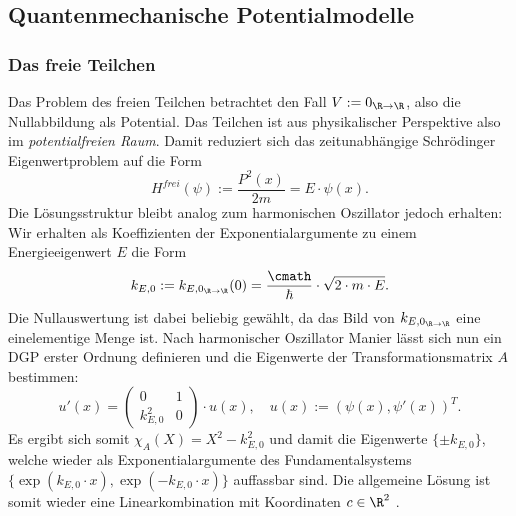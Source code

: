 \documentclass[../main.tex]{subfiles}
\begin{document}
    \subsection{Quantenmechanische Potentialmodelle}
        \subsubsection{Das freie Teilchen}
            Das Problem des freien Teilchen betrachtet den Fall $V:=0_{\R\to\R}$, also die Nullabbildung als Potential. Das Teilchen ist aus physikalischer Perspektive also im \emph{potentialfreien Raum}. Damit reduziert sich das zeitunabhängige Schrödinger Eigenwertproblem auf die Form 
            \[
                H^\textit{frei}(\psi):= \frac{P^2(x)}{2m} = E\cdot\psi(x).
            \]
            Die Lösungsstruktur bleibt analog zum harmonischen Oszillator jedoch erhalten: Wir erhalten als Koeffizienten der Exponentialargumente zu einem Energieeigenwert $E$ die Form 
            \[
                k_{E,0} := k_{E,0_{\R\to\R}}(0) = \frac{\cmath}{\hbar}\cdot\sqrt{2\cdot m\cdot E}. 
            \]
            Die Nullauswertung ist dabei beliebig gewählt, da das Bild von $k_{E,0_{\R\to\R}}$ eine einelementige Menge ist. Nach harmonischer Oszillator Manier lässt sich nun ein DGP erster Ordnung definieren und die Eigenwerte der Transformationsmatrix $A$ bestimmen:
            \[
                u'(x) = \begin{pmatrix}
                    0 & 1\\
                    k_{E,0}^2 & 0
                \end{pmatrix}\cdot u(x),\quad u(x):=(\psi(x), \psi'(x))^T.
            \]
            Es ergibt sich somit $\chi_A(X) = X^2 - k_{E,0}^2$ und damit die Eigenwerte $\{\pm k_{E,0}\}$, welche wieder als Exponentialargumente des Fundamentalsystems $\{\exp(k_{E,0}\cdot x), \exp(-k_{E,0}\cdot x)\}$ auffassbar sind. Die allgemeine Lösung ist somit wieder eine Linearkombination mit Koordinaten $c\in\R^2$ \cite[p.28f,p.38ff]{git:IK4T,junk:Ana3}.
            
\end{document}
